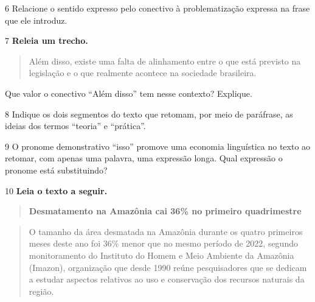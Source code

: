 
\num{6} Relacione o sentido expresso pelo conectivo à problematização
expressa na frase que ele introduz.


\num{7} \textbf{Releia um trecho.}

\begin{quote}
Além disso, existe uma falta de alinhamento entre o que está previsto na
legislação e o que realmente acontece na sociedade brasileira.
\end{quote}

Que valor o conectivo ``Além disso'' tem nesse contexto? Explique.


\num{8} Indique os dois segmentos do texto que retomam, por meio de
paráfrase, as ideias dos termos ``teoria'' e ``prática''.


\num{9} O pronome demonstrativo ``isso'' promove uma economia
linguística no texto ao retomar, com apenas uma palavra, uma expressão
longa. Qual expressão o pronome está substituindo?


\num{10} \textbf{Leia o texto a seguir.}

\begin{quote}
\textbf{Desmatamento na Amazônia cai 36\% no primeiro quadrimestre}
\end{quote}

\begin{quote}
O tamanho da área desmatada na Amazônia durante os quatro primeiros
meses deste ano foi 36\% menor que no mesmo período de 2022, segundo
monitoramento do Instituto do Homem e Meio Ambiente da Amazônia
(Imazon), organização que desde 1990 reúne pesquisadores que se dedicam
a estudar aspectos relativos ao uso e conservação dos recursos naturais
da região.
\end{quote}

